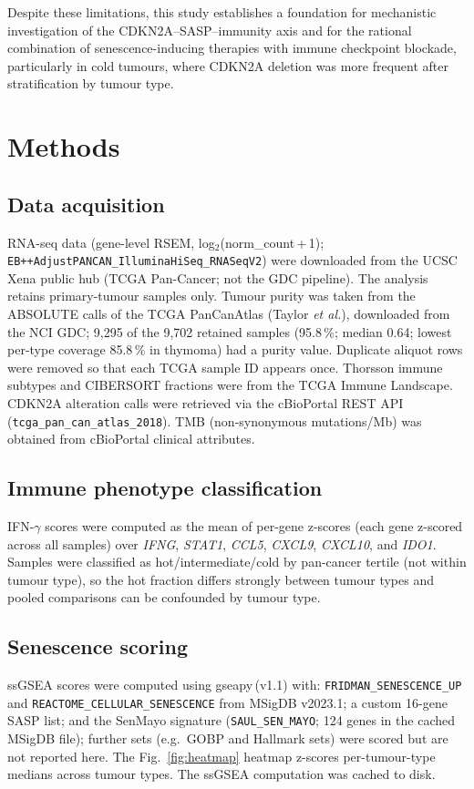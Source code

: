\documentclass[10pt,twocolumn]{article}
\begin{document}
Despite these limitations, this study establishes a foundation for
mechanistic investigation of the CDKN2A--SASP--immunity axis and for
the rational combination of senescence-inducing therapies with immune
checkpoint blockade, particularly in cold tumours, where CDKN2A
deletion was more frequent after stratification by tumour type.

\section{Methods}

\subsection{Data acquisition}
RNA-seq data (gene-level RSEM, log$_2$(norm\_count\,+\,1);
\texttt{EB++AdjustPANCAN\_IlluminaHiSeq\_RNASeqV2}) were downloaded from
the UCSC Xena public hub (TCGA Pan-Cancer; not the GDC pipeline). The
analysis retains primary-tumour samples only. Tumour
purity was taken from the ABSOLUTE calls of the TCGA PanCanAtlas (Taylor
\textit{et al.}\cite{Taylor2018}), downloaded from the NCI GDC; 9,295 of the
9,702 retained samples (95.8\,\%; median 0.64; lowest per-type coverage
85.8\,\% in thymoma) had a purity value. Duplicate aliquot rows were
removed so that each TCGA sample ID appears once.
Thorsson immune subtypes and CIBERSORT fractions were from the TCGA
Immune Landscape\cite{Thorsson2018}. CDKN2A alteration calls were
retrieved via the cBioPortal REST API
(\texttt{tcga\_pan\_can\_atlas\_2018}). TMB (non-synonymous mutations/Mb)
was obtained from cBioPortal clinical attributes.

\subsection{Immune phenotype classification}
IFN-$\gamma$ scores were computed as the mean of per-gene z-scores
(each gene z-scored across all samples) over \textit{IFNG},
\textit{STAT1}, \textit{CCL5}, \textit{CXCL9}, \textit{CXCL10}, and
\textit{IDO1}. Samples were classified as hot/intermediate/cold by
pan-cancer tertile (not within tumour type), so the hot fraction differs
strongly between tumour types and pooled comparisons can be confounded
by tumour type.

\subsection{Senescence scoring}
ssGSEA scores were computed using gseapy\,(v1.1)\cite{Fang2023} with:
\texttt{FRIDMAN\_SENESCENCE\_UP} and \texttt{REACTOME\_CELLULAR\_SENESCENCE}
from MSigDB v2023.1; a custom 16-gene SASP list; and the SenMayo
signature\cite{Saul2022} (\texttt{SAUL\_SEN\_MAYO}; 124 genes in the cached
MSigDB file); further sets (e.g.\ GOBP and Hallmark sets) were scored but
are not reported here. The Fig.~\ref{fig:heatmap} heatmap z-scores
per-tumour-type medians across tumour types. The ssGSEA computation was cached to
disk.
\end{document}
